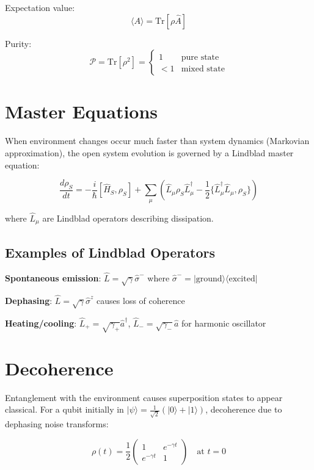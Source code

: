 \documentclass[12pt,openany,oneside]{book}
\newcommand{\ket}[1]{|#1\rangle}
\newcommand{\bra}[1]{\langle #1|}
\begin{document}
{{{Expectation value:
\[
\langle A \rangle = \text{Tr}[\rho\hat{A}]
\]

Purity:
\[
\mathcal{P} = \text{Tr}[\rho^2] = \begin{cases} 1 & \text{pure state} \\ < 1 & \text{mixed state} \end{cases}
\]

\section{Master Equations}

When environment changes occur much faster than system dynamics (Markovian approximation), the open system evolution is governed by a Lindblad master equation:

\[
\frac{d\rho_S}{dt} = -\frac{i}{\hbar}[\hat{H}_S, \rho_S] + \sum_\mu \left(\hat{L}_\mu\rho_S\hat{L}_\mu^\dagger - \frac{1}{2}\{\hat{L}_\mu^\dagger\hat{L}_\mu, \rho_S\}\right)
\]

where $\hat{L}_\mu$ are Lindblad operators describing dissipation.

\subsection{Examples of Lindblad Operators}

\textbf{Spontaneous emission}: $\hat{L} = \sqrt{\gamma}\hat{\sigma}^-$ where $\hat{\sigma}^- = \ket{\text{ground}}\bra{\text{excited}}$

\textbf{Dephasing}: $\hat{L} = \sqrt{\gamma}\hat{\sigma}^z$ causes loss of coherence

\textbf{Heating/cooling}: $\hat{L}_+ = \sqrt{\gamma_+}\hat{a}^\dagger$, $\hat{L}_- = \sqrt{\gamma_-}\hat{a}$ for harmonic oscillator

\section{Decoherence}

Entanglement with the environment causes superposition states to appear classical. For a qubit initially in $\ket{\psi} = \frac{1}{\sqrt{2}}(\ket{0} + \ket{1})$, decoherence due to dephasing noise transforms:

\[
\rho(t) = \frac{1}{2}\begin{pmatrix} 1 & e^{-\gamma t} \\ e^{-\gamma t} & 1 \end{pmatrix} \quad \text{at } t = 0
\]

}}}
\end{document}
